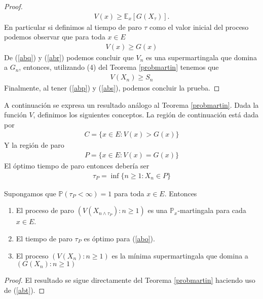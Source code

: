 \begin{proof}
	\begin{align*}
	V(x) \geq \mathbb{E}_x [G(X_\tau)].
	\end{align*}
En particular si definimos al tiempo de paro $\tau$ como el valor inicial del proceso podemos observar que para toda $x \in E$
	\begin{align}
	V(x) \geq G(x) \label{abr}
	\end{align}
De (\ref{abq}) y (\ref{abr}) podemos concluir que $V_n$ es una supermartingala que domina a $G_n$, entonces, utilizando (4) del Teorema \ref{probmartin} tenemos que
	\begin{align}
	V(X_n) \geq S_n \label{abs}
	\end{align}
Finalmente, al tener (\ref{abp}) y (\ref{abs}), podemos concluir la prueba.
\end{proof}

A continuación se expresa un resultado análogo al Teorema \ref{probmartin}. Dada la función $V$, definimos los siguientes conceptos. La región de continuación está dada por
	\begin{align*}
	C = \{x \in E : V(x) > G(x)\}
	\end{align*}
Y la región de paro
	\begin{align*}
	P = \{x \in E : V(x) = G(x)\}
	\end{align*}
El óptimo tiempo de paro entonces debería ser
	\begin{align*}
	\tau_P = \inf \{n \geq 1 : X_n \in P\}
	\end{align*}

\begin{theorem}
\label{paro_markov}
Supongamos que $\mathbb{P} (\tau_P < \infty) = 1$ para toda $x \in E$. Entonces
	\begin{enumerate}
	\item El proceso de paro $(V(X_{n \wedge \tau_P}) : n \geq 1)$ es una $\mathbb{P}_x$-martingala para cada $x \in E$.
	\item El tiempo de paro $\tau_P$ es óptimo para (\ref{abo}).
	\item El proceso $(V(X_n) : n \geq 1)$ es la mínima supermartingala que domina a $(G(X_n) : n \geq 1)$
	\end{enumerate}
\end{theorem}
\begin{proof}
El resultado se sigue directamente del Teorema \ref{probmartin} haciendo uso de (\ref{abt}).
\end{proof}